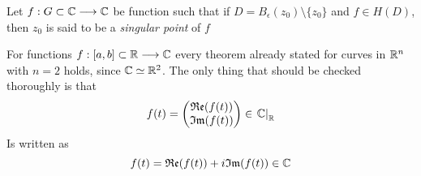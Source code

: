 \documentclass[../complete.tex]{subfiles}
\begin{document}
\begin{dfn}
	Let $f:G\subset\Cf\fto\Cf$ be function such that if $D=B_\epsilon(z_0)\setminus\{z_0\}$ and $f\in H(D)$, then $z_0$ is said to be a \textit{singular point} of $f$
\end{dfn}
%
For functions $f:[a,b]\subset\R\fto\Cf$ every theorem already stated for curves in $\R^n$ with $n=2$ holds, since $\Cf\simeq\R^2$. The only thing that should be checked thoroughly is that
\begin{equation*}
	f(t)=\begin{pmatrix}\real(f(t))\\\imaginary(f(t))\end{pmatrix}\in\derin[\R]{\Cf}
\end{equation*}
Is written as
\begin{equation*}
	f(t)=\real(f(t))+i\imaginary(f(t))\in\Cf
\end{equation*}
\end{document}
